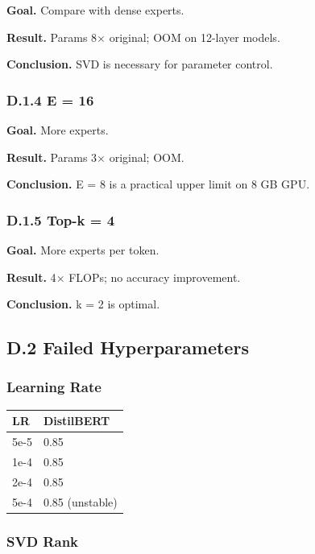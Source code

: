 \textbf{Goal.} Compare with dense experts.

\textbf{Result.} Params 8$\times$ original; OOM on 12-layer models.

\textbf{Conclusion.} SVD is necessary for parameter control.

\subsubsection{D.1.4 E = 16}

\textbf{Goal.} More experts.

\textbf{Result.} Params 3$\times$ original; OOM.

\textbf{Conclusion.} E = 8 is a practical upper limit on 8 GB GPU.

\subsubsection{D.1.5 Top-k = 4}

\textbf{Goal.} More experts per token.

\textbf{Result.} 4$\times$ FLOPs; no accuracy improvement.

\textbf{Conclusion.} k = 2 is optimal.

\subsection{D.2 Failed Hyperparameters}

\subsubsection{Learning Rate}

\begin{table}[H]
\centering
\small
\begin{tabular}{ll}
\toprule
\textbf{LR} & \textbf{DistilBERT} \\
\midrule
5e-5 & 0.85 \\
1e-4 & 0.85 \\
2e-4 & 0.85 \\
5e-4 & 0.85 (unstable) \\
\bottomrule
\end{tabular}
\end{table}

\subsubsection{SVD Rank}

